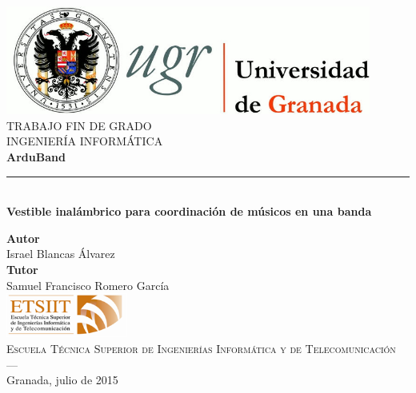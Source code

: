 \begin{titlepage}


\newlength{\centeroffset}
\setlength{\centeroffset}{-0.5\oddsidemargin}
\addtolength{\centeroffset}{0.5\evensidemargin}
\thispagestyle{empty}

\noindent\hspace*{\centeroffset}\begin{minipage}{\textwidth}

\centering
\includegraphics[width=0.9\textwidth]{imagenes/logo_ugr.jpg}\\[1.4cm]

\textsc{ \Large TRABAJO FIN DE GRADO\\[0.2cm]}
\textsc{ INGENIERÍA INFORMÁTICA}\\[1cm]
%
{\Huge\bfseries ArduBand\\
}
\noindent\rule[-1ex]{\textwidth}{3pt}\\[3.5ex]
{\large\bfseries  Vestible inalámbrico para coordinación de músicos en una banda}
\end{minipage}

\vspace{2.5cm}
\noindent\hspace*{\centeroffset}\begin{minipage}{\textwidth}
\centering

\textbf{Autor}\\ {Israel Blancas Álvarez}\\[2.5ex]
\textbf{Tutor}\\
{Samuel Francisco Romero García}\\[2cm]
\includegraphics[width=0.3\textwidth]{imagenes/etsiit_logo.png}\\[0.1cm]
\textsc{Escuela Técnica Superior de Ingenierías Informática y de Telecomunicación}\\
\textsc{---}\\
Granada, julio de 2015
\end{minipage}
\end{titlepage}
